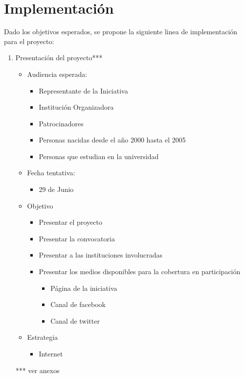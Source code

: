 \documentclass{article}
\begin{document}
\section{Implementación}

Dado los objetivos esperados, se propone la siguiente linea de implementación para el proyecto:

\begin{enumerate}
\item Presentación del proyecto***
\begin{itemize}
\item Audiencia esperada:
\begin{itemize}
\item Representante de la Iniciativa
\item Institución Organizadora
\item Patrocinadores
\item Personas nacidas desde el año 2000 hasta el 2005
\item Personas que estudian en la universidad
\end{itemize}
\item Fecha tentativa:
\begin{itemize}
\item 29 de Junio
\end{itemize}
\item Objetivo
\begin{itemize}
\item Presentar el proyecto
\item Presentar la convocatoria
\item Presentar a las instituciones involucradas
\item Presentar los medios disponibles para la cobertura en participación
\begin{itemize}
\item Página de la iniciativa 
\item Canal de facebook
\item Canal de twitter
\end{itemize}
\end{itemize}
\item Estrategia
\begin{itemize}
\item Internet
\end{itemize}
\end{itemize}
*** ver anexos


\end{enumerate}
\end{document}
